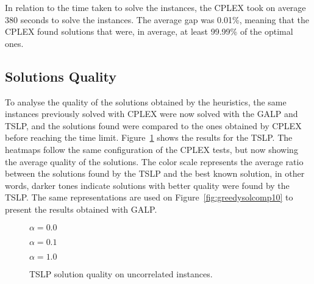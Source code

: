 In relation to the time taken to solve the instances, the CPLEX took on average 380 seconds to solve the instances. The average gap was 
0.01\%, meaning that the CPLEX found solutions that were, in average, at least 99.99\% of the optimal ones.

\subsection{Solutions Quality}

To analyse the quality of the solutions obtained by the heuristics, the same instances previously solved with CPLEX were now solved with
the GALP and TSLP, and the solutions found were compared to the ones obtained by CPLEX before reaching the time limit. 
Figure~\ref{fig:tabusolcomp10} shows the results for the TSLP. The heatmaps follow the same configuration 
of the CPLEX tests, but now showing the average quality of the solutions. The color scale represents
the average ratio between the solutions found by the TSLP and the best known solution, in other words, darker tones indicate solutions
with better quality were found by the TSLP. The same representations are used on Figure~\ref{fig:greedysolcomp10} 
to present the results obtained with GALP.

\figpar
\begin{figure}[H]
  \centering
  \resizebox{\columnwidth}{!}{%
    \subfloat[1 resource]{}
    \subfloat[2 resources]{}
    \subfloat[4 resources]{}
  }
  $\alpha = 0.0$
\end{figure}

\figspaces
\begin{figure}[H]
  \centering
  \resizebox{\columnwidth}{!}{%
    \subfloat[1 resource]{}
    \subfloat[2 resources]{}
    \subfloat[4 resources]{}
  }
  $\alpha = 0.1$
\end{figure}

\figspaces
\begin{figure}[H]
  \centering
  \resizebox{\columnwidth}{!}{%
    \subfloat[1 resource]{} 
    \subfloat[2 resources]{}
    \subfloat[4 resources]{}
  }
  $\alpha = 1.0$
  \caption{TSLP solution quality on uncorrelated instances.}
  \label{fig:tabusolcomp10}
\end{figure}

